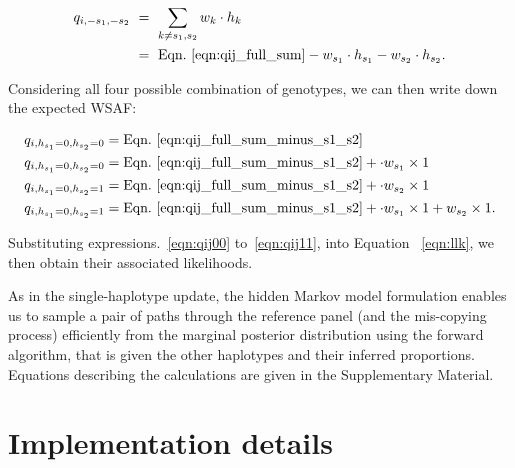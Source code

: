 \documentclass{nature}
\begin{document}
\begin{equation}
\begin{split}
q_{i,-s_1, -s_2} & ~ = ~ \sum_{k\neq s_1,s_2} w_k \cdot h_k \\
                 & ~ = ~ \textrm{Eqn.~\eqref{eqn:qij_full_sum}} - w_{s_1} \cdot h_{s_1} - w_{s_2} \cdot h_{s_2}.
\label{eqn:qij_full_sum_minus_s1_s2}
\end{split}
\end{equation}

\noindent Considering all four possible combination of genotypes, we can then write down the expected WSAF:

\begin{align}
q_{i,h_{s_1}=0,h_{s_2}=0} & = \textrm{Eqn.~\eqref{eqn:qij_full_sum_minus_s1_s2}} \label{eqn:qij00}\\
q_{i,h_{s_1}=0,h_{s_2}=0} & = \textrm{Eqn.~\eqref{eqn:qij_full_sum_minus_s1_s2}} + \cdot w_{s_1} \times 1 \label{eqn:qij10}\\
q_{i,h_{s_1}=0,h_{s_2}=1} & = \textrm{Eqn.~\eqref{eqn:qij_full_sum_minus_s1_s2}} + \cdot w_{s_2} \times 1 \label{eqn:qij01}\\
q_{i,h_{s_1}=0,h_{s_2}=1} & = \textrm{Eqn.~\eqref{eqn:qij_full_sum_minus_s1_s2}} + \cdot w_{s_1} \times 1 + w_{s_2} \times 1 \label{eqn:qij11}.
\end{align}

\noindent Substituting expressions.~\eqref{eqn:qij00} to~\eqref{eqn:qij11}, into Equation ~\eqref{eqn:llk}, we then obtain their associated likelihoods.

As in the single-haplotype update, the hidden Markov model formulation enables us to sample a pair of paths through the reference panel (and the mis-copying process) efficiently from the marginal posterior distribution using the forward algorithm, that is given the other haplotypes and their inferred proportions.  Equations describing the calculations are given in the Supplementary Material.


\section*{Implementation details}
\end{document}
